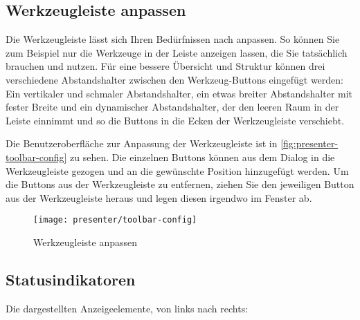 \subsection{Werkzeugleiste anpassen}

Die Werkzeugleiste lässt sich Ihren Bedürfnissen nach anpassen. So können Sie zum Beispiel nur die Werkzeuge in der Leiste anzeigen lassen, die Sie tatsächlich brauchen und nutzen. Für eine bessere Übersicht und Struktur können drei verschiedene Abstandshalter zwischen den Werkzeug-Buttons eingefügt werden: Ein vertikaler und schmaler Abstandshalter, ein etwas breiter Abstandshalter mit fester Breite und ein dynamischer Abstandshalter, der den leeren Raum in der Leiste einnimmt und so die Buttons in die Ecken der Werkzeugleiste verschiebt.

Die Benutzeroberfläche zur Anpassung der Werkzeugleiste ist in \autoref{fig:presenter-toolbar-config} zu sehen. Die einzelnen Buttons können aus dem Dialog in die Werkzeugleiste gezogen und an die gewünschte Position hinzugefügt werden. Um die Buttons aus der Werkzeugleiste zu entfernen, ziehen Sie den jeweiligen Button aus der Werkzeugleiste heraus und legen diesen irgendwo im Fenster ab.

\begin{figure}[H]
	\texttt{[image: presenter/toolbar-config]}
	\caption{Werkzeugleiste anpassen}
	\label{fig:presenter-toolbar-config}
\end{figure}

\subsection{Statusindikatoren}
Die dargestellten Anzeigeelemente, von links nach rechts:\\

